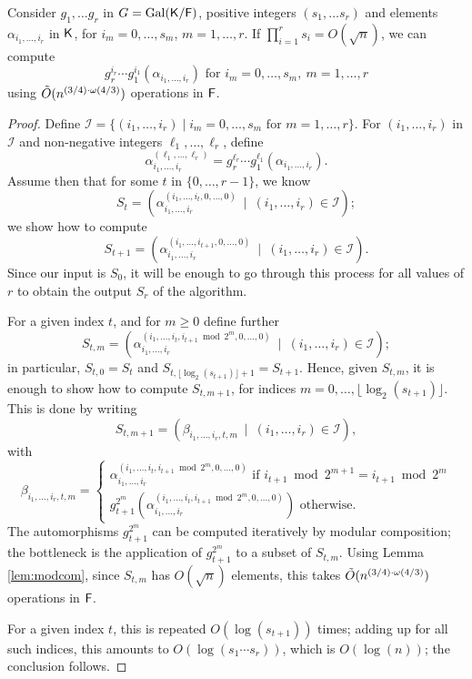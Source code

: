 \begin{lemma}\label{lem:selfcomp}
  Consider $g_1, \ldots g_r$ in $G=\mathrm{Gal}({\mathsf{K}}/{\mathsf{F}})$, positive
  integers $(s_1, \ldots s_r)$ and elements $\alpha_{i_1, \dots, i_r}$
  in ${\mathsf{K}}$, for $i_m=0,\dots,s_m$, $m=1,\dots,r$. If $\prod_{i = 1}^r
  s_i = O(\sqrt{n})$, we can compute
  $$g_r^{i_r}\cdots g_1^{i_1}(\alpha_{i_1, \dots, i_r})
  \text{~for~} i_m=0,\dots,s_m,\ m=1,\dots,r
  $$  using $\tilde{O}(n^{(3/4)\cdot \omega(4/3)})$ operations in ${\mathsf{F}}$.
\end{lemma}
\begin{proof}
  Define $\mathcal I = \{(i_1,\dots,i_r) \mid i_m=0,\dots,s_m
  \text{~for~} m=1,\dots,r\}$. For $(i_1,\dots,i_r)$ in $\mathcal I$
  and non-negative integers $\ell_1,\dots,\ell_r$, define
  $$\alpha_{i_1, \dots, i_r}^{(\ell_1,\dots,\ell_r)} 
  =g_r^{\ell_r} \cdots g_1^{\ell_1}(\alpha_{i_1, \dots, i_r}).$$  
  Assume then that
  for some $t$ in $\{0,\dots,r-1\}$, we know 
  $$S_t=(\alpha_{i_1, \dots,i_r}^{(i_1, \dots, i_{t},0, \dots, 0)} \ \mid \ (i_1,\dots,i_r)\in \mathcal I);$$ we show how to compute 
  $$S_{t+1}=(\alpha_{i_1, \dots,i_r}^{(i_1, \dots, i_{t+1},0, \dots,
    0)} \ \mid \ (i_1,\dots,i_r)\in \mathcal I).$$ Since our input is
  $S_0$, it will be enough to go through this process for all values
  of $r$ to obtain the output $S_r$ of the algorithm.
  
  For a given index $t$, and for $m \ge 0$
  define further 
  $$S_{t,m}=(\alpha_{i_1, \dots,i_r}^{(i_1, \dots, i_{t},i_{t+1} \bmod 2^m, 0,\dots, 0)} \ \mid \ (i_1,\dots,i_r)\in \mathcal I);$$
  in particular, $S_{t,0} = S_t$ and $S_{t,\lfloor \log_2(s_{t+1})\rfloor+1} = S_{t+1}$. 
  Hence, given $S_{t,m}$, it is enough to show how to compute $S_{t,m+1}$,
  for indices $m=0,\dots,\lfloor \log_2(s_{t+1})\rfloor$.
  This is done by writing 
  $$S_{t,m+1}=
  (\beta_{i_1, \dots,i_r,t,m} \ \mid \ (i_1,\dots,i_r)\in \mathcal I),$$
  with
  $$\beta_{i_1, \dots,i_r,t,m}
  =\begin{cases}
  \alpha_{i_1, \dots,i_r}^{(i_1, \dots, i_{t},i_{t+1} \bmod 2^m,0, \dots, 0)}  \text{~if~} 
  i_{t+1} \bmod 2^{m+1} = i_{t+1} \bmod 2^m \\[2mm]
  g_{t+1}^{2^{m}}(\alpha_{i_1, \dots,i_r}^{(i_1, \dots, i_{t},i_{t+1} \bmod 2^m,0, \dots, 0)}) 
  \text{~otherwise.}
  \end{cases}$$
  The automorphisms $g_{t+1}^{2^m}$ can be computed iteratively by modular
  composition; the bottleneck is the application of  $g_{t+1}^{2^m}$
  to a subset of $S_{t,m}$. Using Lemma \ref{lem:modcom}, since 
  $S_{t,m}$ has $O(\sqrt n)$ elements, this takes $\tilde{O}(n^{(3/4)\cdot \omega(4/3)})$ 
  operations in ${\mathsf{F}}$.
  
  For a given index $t$, this is repeated $O(\log(s_{t+1}))$ times;
  adding up for all such indices, this amounts to $O(\log (s_1 \cdots s_r))$,
  which is $O(\log(n))$; the conclusion follows.
\end{proof}

